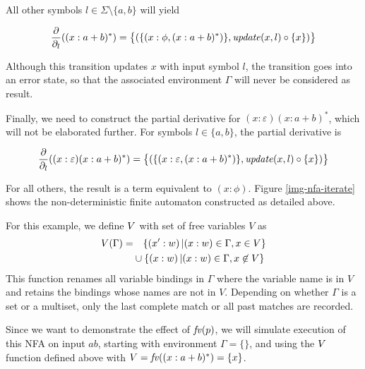 \begin{eg}
   All other symbols $l \in \Sigma \setminus \{a, b\}$ will yield

   \[
      \ddl((x:a+b)^*) =
      \big\{ (\{ (x:\phi, (x:a+b)^*) \}, \updatexl \circ \iteratex) \big\}
   \]

   Although this transition updates $x$ with input symbol $l$, the transition
   goes into an error state, so that the associated environment $\Gamma$ will
   never be considered as result.

   Finally, we need to construct the partial derivative for $(x:\varepsilon)
   (x:a+b)^*$, which will not be elaborated further. For symbols $l \in \{a,
   b\}$, the partial derivative is

   \[
      \ddl((x:\varepsilon)(x:a+b)^*) =
      \big\{ (\{ (x:\varepsilon, (x:a+b)^*) \}, \updatexl \circ \iteratex) \big\}
   \]

   For all others, the result is a term equivalent to $(x:\phi)$. Figure
   \ref{img-nfa-iterate} shows the non-deterministic finite automaton
   constructed as detailed above.


   For this example, we define $\iterate{V}$ with set of free variables $V$ as
   \begin{align*}
      \iterate{V}(\Gamma) = &\quad \{ (x':w) \where (x:w) \in \Gamma, x \in V \} \\
      & \cup \{ (x:w) \where (x:w) \in \Gamma, x \not\in V \}
   \end{align*}
   This function renames all variable bindings in $\Gamma$ where the variable
   name is in $V$ and retains the bindings whose names are not in $V$. Depending
   on whether $\Gamma$ is a set or a multiset, only the last complete match or
   all past matches are recorded.

   Since we want to demonstrate the effect of $\iteratefvp$, we will simulate
   execution of this NFA on input $ab$, starting with environment $\Gamma =
   \{\}$, and using the $\iterate{V}$ function defined above with $V =
   \mathit{fv}((x:a+b)^*) = \{x\}$.


\end{eg}
